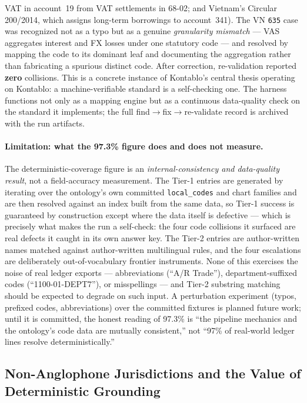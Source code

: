 VAT in account~19 from VAT settlements in 68-02; and Vietnam's Circular
200/2014, which assigns long-term borrowings to account~341). The VN \texttt{635}
case was recognized not as a typo but as a genuine \emph{granularity mismatch} ---
VAS aggregates interest and FX losses under one statutory code --- and resolved
by mapping the code to its dominant leaf and documenting the aggregation rather
than fabricating a spurious distinct code. After correction, re-validation
reported \textbf{zero} collisions. This is a concrete instance of Kontablo's
central thesis operating on Kontablo: a machine-verifiable standard is a
self-checking one. The harness functions not only as a mapping engine but as a
continuous data-quality check on the standard it implements; the full
find$\to$fix$\to$re-validate record is archived with the run artifacts.

\paragraph{Limitation: what the 97.3\% figure does and does not measure.}
The deterministic-coverage figure is an \emph{internal-consistency and
data-quality result}, not a field-accuracy measurement. The Tier-1 entries
are generated by iterating over the ontology's own committed
\texttt{local\_codes} and chart families and are then resolved against an
index built from the same data, so Tier-1 success is guaranteed by
construction except where the data itself is defective --- which is precisely
what makes the run a self-check: the four code collisions it surfaced are
real defects it caught in its own answer key. The Tier-2 entries are
author-written names matched against author-written multilingual rules, and
the four escalations are deliberately out-of-vocabulary frontier instruments.
None of this exercises the noise of real ledger exports --- abbreviations
(``A/R Trade''), department-suffixed codes (``1100-01-DEPT7''), or
misspellings --- and Tier-2 substring matching should be expected to degrade
on such input. A perturbation experiment (typos, prefixed codes,
abbreviations) over the committed fixtures is planned future work; until it
is committed, the honest reading of 97.3\% is ``the pipeline mechanics and
the ontology's code data are mutually consistent,'' not ``97\% of real-world
ledger lines resolve deterministically.''

\subsection{Non-Anglophone Jurisdictions and the Value of Deterministic Grounding}


